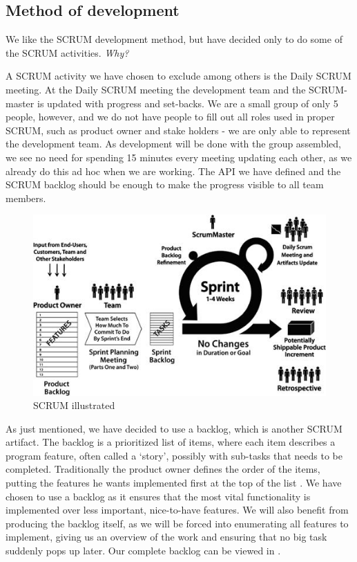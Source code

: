 \subsection{Method of development}
We like the SCRUM development method, but have decided only to do some of the SCRUM activities. \textit{Why?}

A SCRUM activity we have chosen to exclude among others is the Daily SCRUM meeting.
At the Daily SCRUM meeting the development team and the SCRUM-master is updated with progress and set-backs.
We are a small group of only 5 people, however, and we do not have people to fill out all roles used in proper SCRUM, such as product owner and stake holders - we are only able to represent the development team.
As development will be done with the group assembled, we see no need for spending 15 minutes every meeting updating each other, as we already do this ad hoc when we are working.
The API we have defined and the SCRUM backlog should be enough to make the progress visible to all team members.

\begin{figure}[H]
  \includegraphics[width=\textwidth]{illustrations/scrum.jpg}
  \caption{SCRUM illustrated}
  \label{scrum_picture}
\end{figure}

As just mentioned, we have decided to use a backlog, which is another SCRUM artifact.
The backlog is a prioritized list of items, where each item describes a program feature, often called a `story', possibly with sub-tasks that needs to be completed. Traditionally the product owner defines the order of the items, putting the features he wants implemented first at the top of the list \cite[p. 12]{scrum-org-guide}.
We have chosen to use a backlog as it ensures that the most vital functionality is implemented over less important, nice-to-have features. We will also benefit from producing the backlog itself, as we will be forced into enumerating all features to implement, giving us an overview of the work and ensuring that no big task suddenly pops up later.
Our complete backlog can be viewed in .

